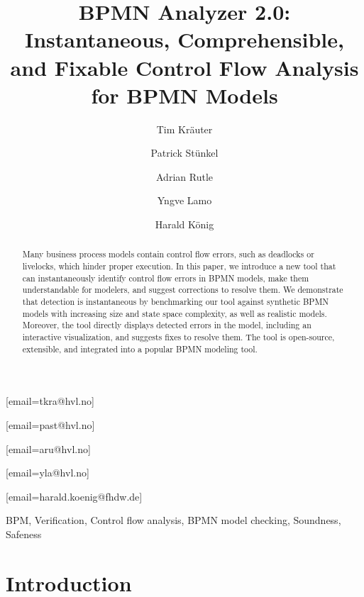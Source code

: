 \documentclass[
twocolumn
]{ceurart}
\begin{document}


\title{BPMN Analyzer 2.0: Instantaneous, Comprehensible, and Fixable Control Flow Analysis for BPMN Models}

\author[1]{Tim Kräuter}
[email=tkra@hvl.no]
\author[1]{Patrick Stünkel}
[email=past@hvl.no] %
\author[1]{Adrian Rutle}
[email=aru@hvl.no]
\author[1]{Yngve Lamo}
[email=yla@hvl.no]
\author[2,1]{Harald König}
[email=harald.koenig@fhdw.de]
\address[1]{Western Norway University of Applied Sciences, Bergen, Norway}
\address[2]{FHDW Hannover, Germany}

\begin{abstract}
Many business process models contain control flow errors, such as deadlocks or livelocks, which hinder proper execution.
In this paper, we introduce a new tool that can instantaneously identify control flow errors in BPMN models, make them understandable for modelers, and suggest corrections to resolve them.
We demonstrate that detection is instantaneous by benchmarking our tool against synthetic BPMN models with increasing size and state space complexity, as well as realistic models.
Moreover, the tool directly displays detected errors in the model, including an interactive visualization, and suggests fixes to resolve them.
The tool is open-source, extensible, and integrated into a popular BPMN modeling tool.
\end{abstract}

\begin{keywords}
BPM,
Verification,
Control flow analysis,
BPMN model checking,
Soundness,
Safeness
\end{keywords}

\maketitle

\section{Introduction}
\end{document}
